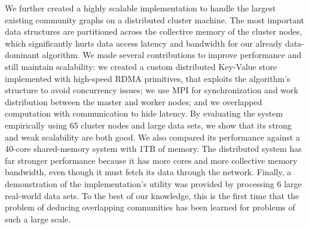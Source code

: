 We further created a highly scalable implementation to handle the largest existing
community graphs on a distributed cluster machine. The most important data structures
are partitioned across the collective memory of the cluster nodes, which
significantly hurts data access latency and bandwidth for our already data-dominant algorithm.
We made several contributions to improve performance and still maintain scalability:
we created a custom distributed Key-Value store implemented with high-speed RDMA
primitives, that exploits the algorithm's structure to avoid concurrency issues; we
use MPI for synchronization and work distribution between the master and worker nodes;
and
we overlapped computation
with communication to hide latency.
%
By evaluating the system empirically using 65 cluster nodes and large data sets,
we show that its strong and weak scalability are both good. We also compared its
performance against a 40-core shared-memory system with 1TB of memory.
The distributed system has far stronger performance because it has more cores and
more collective memory bandwidth, even though it must fetch its data through the network.
Finally, a
demonstration of the implementation's utility was provided by processing 6
large real-world data sets.
To the best of
our knowledge, this is the first time that the problem of deducing overlapping
communities has been learned for problems of such a large scale.

